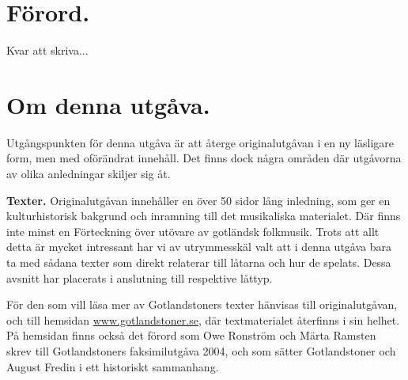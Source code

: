 \fancyhfoffset[E,O]{0pt}
\addtolength{\skip\footins}{\baselineskip}
{
\setlength{\parindent}{1.5em}



\section*{\centering \LARGE Förord.}\vspace{1cm}

Kvar att skriva...



\clearpage


\section*{\centering \LARGE Om denna utgåva.}\vspace{1cm}



Utgångspunkten för denna utgåva är att återge originalutgåvan i en ny läsligare
form, men med oförändrat innehåll. Det finns dock några områden där utgåvorna
av olika anledningar skiljer sig åt.

\vspace{3mm}
\textbf{Texter.} Originalutgåvan innehåller en över 50 sidor lång inledning,
som ger en kulturhistorisk bakgrund och inramning till det musikaliska materialet.
Där finns inte minst en \guillemotright{}Förteckning över utövare av gotländsk
folkmusik\guillemotright{}. Trots
att allt detta är mycket intressant har vi av utrymmesskäl valt att i denna
utgåva bara ta med sådana texter som direkt relaterar till låtarna och hur de
spelats. Dessa avsnitt har placerats i anslutning till respektive låttyp.

För den som vill läsa mer av Gotlandstoners texter hänvisas till originalutgåvan,
och till hemsidan \href{http://www.gotlandstoner.se/}{www.gotlandstoner.se}, där textmaterialet återfinns i sin helhet.
På hemsidan finns också det förord som Owe Ronström och
Märta Ramsten skrev till Gotlandstoners faksimilutgåva 2004, och som
sätter Gotlandstoner och August Fredin i ett historiskt sammanhang.

}

